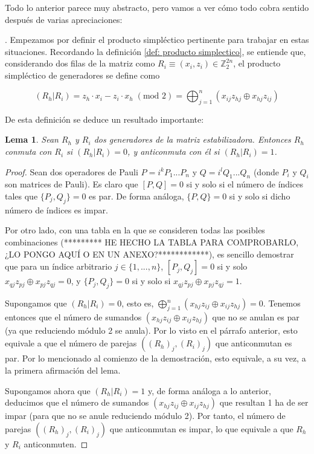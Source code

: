 \documentclass[11pt,a4paper,twoside,pdf]{article}
\numberwithin{equation}{section}
\newtheorem{lemma}{Lema}
\begin{document}
		Todo lo anterior parece muy abstracto, pero vamos a ver cómo todo cobra sentido después de varias  apreciaciones:
		
		. Empezamos por definir el producto simpléctico pertinente para trabajar en estas situaciones. Recordando la definición \ref{def: producto simplectico}, se entiende que, considerando dos filas de la matriz como $R_i \equiv (x_i,z_i) \in \mathbb{Z}_2^{2n}$, el producto simpléctico de generadores se define como
		
			\begin{equation}
				(R_h|R_i) = z_h \cdot x_i - z_i \cdot x_h \; (\text{mod }2) = 
									\displaystyle\bigoplus_{j=1}^n (x_{ij}z_{hj} \oplus x_{hj}z_{ij})
			\end{equation}
		
		De esta definición se deduce un resultado importante:
		
			\begin{lemma}\label{lema: lema 1}
				Sean $R_h$ y $R_i$ dos generadores de la matriz estabilizadora. Entonces $R_h$ conmuta con $R_i$ si $(R_h|R_i)=0$, y anticonmuta con él si $(R_h|R_i)=1$.
			\end{lemma}
		
			\begin{proof}
				Sean dos operadores de Pauli $P=i^kP_1...P_n$ y $Q=i^lQ_1...Q_n$ (donde $P_i$ y $Q_i$ son matrices de Pauli). Es claro que $[P,Q]=0$ si y solo si el número de índices tales que $\{P_j,Q_j\}=0$ es par. De forma análoga, $\{P,Q\}=0$ si y solo si dicho número de índices es impar.
				
				Por otro lado, con una tabla en la que se consideren todas las posibles combinaciones (********* HE HECHO LA TABLA PARA COMPROBARLO, ¿LO PONGO AQUÍ O EN UN ANEXO?************), es sencillo demostrar que para un índice arbitrario $j \in \{1,...,n\}$, $[P_j,Q_j]=0$ si y solo $x_{qj}z_{pj}\oplus x_{pj}z_{qj}=0$, y $\{P_j,Q_j\}=0$ si y solo si $x_{qj}z_{pj}\oplus x_{pj}z_{qj}=1$. 
				
				
				Supongamos que $(R_h|R_i)=0$, esto es, $\bigoplus_{j=1}^n (x_{hj}z_{ij} \oplus x_{ij}z_{hj})=0$. Tenemos entonces que el número de sumandos $(x_{hj}z_{ij} \oplus x_{ij}z_{hj})$ que no se anulan es par (ya que reduciendo módulo 2 se anula). Por lo visto en el párrafo anterior, esto equivale a que el número de parejas $\left( (R_h)_j,(R_i)_j\right)$ que anticonmutan es par. Por lo mencionado al comienzo de la demostración, esto equivale, a su vez, a la primera afirmación del lema.
				
				Supongamos ahora que $(R_h|R_i)=1$ y, de forma análoga a lo anterior, deducimos que el número de sumandos $(x_{hj}z_{ij} \oplus x_{ij}z_{hj})$ que resultan 1 ha de ser impar (para que no se anule reduciendo módulo 2). Por tanto, el número de parejas $\left( (R_h)_j,(R_i)_j\right)$ que anticonmutan es impar, lo que equivale a que $R_h$ y $R_i$ anticonmuten.
			\end{proof}
		
\end{document}
